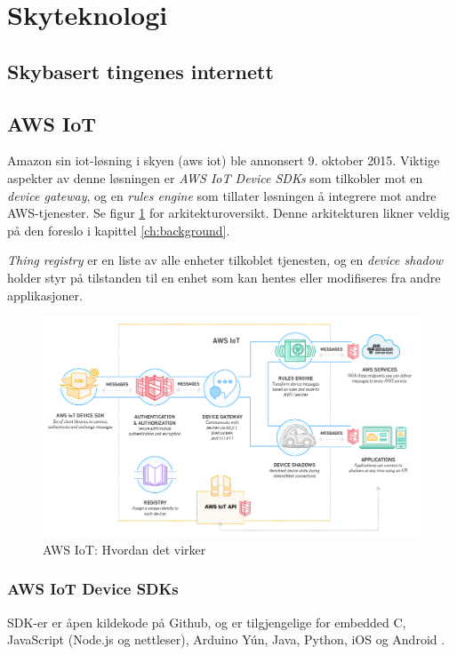 \section{Skyteknologi}
\blindtext

\subsection{Skybasert tingenes internett}
\blindtext

\subsection{AWS IoT}
\label{sec:aws_iot}
Amazon sin \gls{iot}-løsning i skyen (\gls{aws} \gls{iot}) ble annonsert 9. oktober 2015.
Viktige aspekter av denne løsningen er \textit{AWS IoT Device SDKs} som tilkobler mot 
en \textit{device gateway}, og en \textit{rules engine} som tillater løsningen å integrere
mot andre AWS-tjenester. Se figur \ref{fig:awsiot_how} for arkitekturoversikt.
Denne arkitekturen likner veldig på den \citet{iot_harvard_smart} foreslo i kapittel \ref{ch:background}.

\textit{Thing registry} er en liste av alle enheter tilkoblet tjenesten, og en \textit{device shadow}
holder styr på tilstanden til en enhet som kan hentes eller modifiseres fra andre applikasjoner.

\begin{figure}
\includegraphics[width=1.0\textwidth,center]{fig/awsiot_how}
\caption{AWS IoT: Hvordan det virker \citep{aws_works}}
\label{fig:awsiot_how}
\end{figure}

\subsubsection{AWS IoT Device SDKs}
SDK-er er åpen kildekode på Github, og er tilgjengelige for embedded C, JavaScript (Node.js og nettleser),
Arduino Yún, Java, Python, iOS og Android \citep{aws_sdks}.

